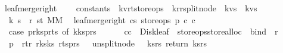 \begin{isabellebody}
\isanewline
\isanewline
\isanewline
\isanewline
\isanewline
{}\isamarkupfalse%
\ leaf{\isacharunderscore}merge{\isacharunderscore}right\ {\isacharcolon}{\isacharcolon}\ \isanewline
\ \ {\isachardoublequoteopen}constants\ {\isasymRightarrow}\ {\isacharparenleft}{\isacharprime}k{\isacharcomma}{\isacharprime}v{\isacharcomma}{\isacharprime}r{\isacharcomma}{\isacharprime}t{\isacharparenright}store{\isacharunderscore}ops\ {\isasymRightarrow}\ {\isacharparenleft}{\isacharprime}k{\isacharcomma}{\isacharprime}r{\isacharparenright}rsplit{\isacharunderscore}node\ {\isasymRightarrow}\ {\isacharparenleft}{\isacharprime}k{\isacharasterisk}{\isacharprime}v{\isacharparenright}s\ {\isasymRightarrow}\ {\isacharparenleft}{\isacharprime}k{\isacharasterisk}{\isacharprime}v{\isacharparenright}s\ {\isasymRightarrow}\ \isanewline
\ \ {\isacharparenleft}{\isacharprime}k\ s\ {\isacharasterisk}\ {\isacharprime}r\ s{\isacharcomma}{\isacharprime}t{\isacharparenright}\ MM{\isachardoublequoteclose}\ \ \isanewline
{}\isanewline
{\isachardoublequoteopen}leaf{\isacharunderscore}merge{\isacharunderscore}right\ cs\ store{\isacharunderscore}ops\ p\ c{}\ c{}\ {\isacharequal}\ {\isacharparenleft}\isanewline
\ \ case\ {\isacharparenleft}p{\isacharbar}{\isachargreater}r{\isacharunderscore}ks{}{\isacharcomma}p{\isacharbar}{\isachargreater}r{\isacharunderscore}ts{}{\isacharparenright}\ of\ {\isacharparenleft}k{}{\isacharhash}ks{}{\isacharcomma}{\isacharunderscore}{\isacharhash}p{\isacharunderscore}rs{}{\isacharparenright}\ {\isasymRightarrow}\ \ \ \isanewline
\ \ {\isacharparenleft}c{}{\isacharat}c{}{\isacharparenright}\ {\isacharbar}{\isachargreater}\ Disk{\isacharunderscore}leaf\ {\isacharbar}{\isachargreater}\ {\isacharparenleft}store{\isacharunderscore}ops{\isacharbar}{\isachargreater}store{\isacharunderscore}alloc{\isacharparenright}\ {\isacharbar}{\isachargreater}\ bind\ {\isacharparenleft}{\isacharpercent}\ r{}{\isachardot}\isanewline
\ \ p\ {\isasymlparr}\ r{\isacharunderscore}t{\isacharcolon}{\isacharequal}r{}{\isacharcomma}\ r{\isacharunderscore}ks{}{\isacharcolon}{\isacharequal}ks{}{\isacharcomma}\ r{\isacharunderscore}ts{}{\isacharcolon}{\isacharequal}p{\isacharunderscore}rs{}\ {\isasymrparr}\ {\isacharbar}{\isachargreater}\ unsplit{\isacharunderscore}node\ {\isacharbar}{\isachargreater}\ {\isacharparenleft}{\isacharpercent}\ {\isacharparenleft}ks{\isacharcomma}rs{\isacharparenright}{\isachardot}\ return\ {\isacharparenleft}ks{\isacharcomma}rs{\isacharparenright}{\isacharparenright}{\isacharparenright}{\isacharparenright}{\isachardoublequoteclose}\isanewline

\end{isabellebody}
